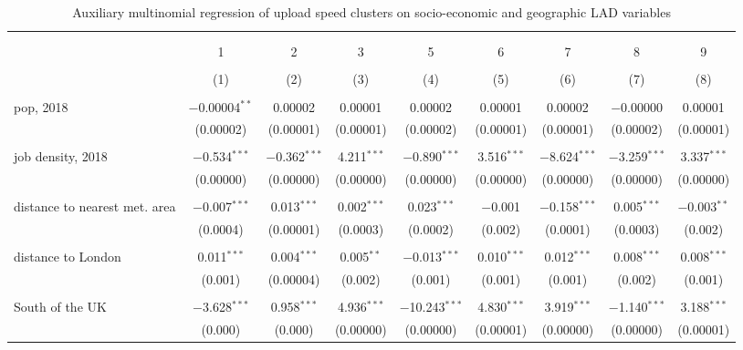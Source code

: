
\begin{sidewaystable}[!htbp] \centering 
  \caption{Auxiliary multinomial regression of upload speed clusters on socio-economic and geographic LAD variables\label{aux}} 
  \label{} 
\tiny 
\begin{tabular}{@{\extracolsep{5pt}}lcccccccc} 
\\[-1.8ex]\hline 
\hline \\[-1.8ex] 
\\[-1.8ex] & 1 & 2 & 3 & 5 & 6 & 7 & 8 & 9 \\ 
\\[-1.8ex] & (1) & (2) & (3) & (4) & (5) & (6) & (7) & (8)\\ 
\hline \\[-1.8ex] 
 pop, 2018 & $-$0.00004$^{**}$ & 0.00002 & 0.00001 & 0.00002 & 0.00001 & 0.00002 & $-$0.00000 & 0.00001 \\ 
  & (0.00002) & (0.00001) & (0.00001) & (0.00002) & (0.00001) & (0.00001) & (0.00002) & (0.00001) \\ 
  & & & & & & & & \\ 
 job density, 2018 & $-$0.534$^{***}$ & $-$0.362$^{***}$ & 4.211$^{***}$ & $-$0.890$^{***}$ & 3.516$^{***}$ & $-$8.624$^{***}$ & $-$3.259$^{***}$ & 3.337$^{***}$ \\ 
  & (0.00000) & (0.00000) & (0.00000) & (0.00000) & (0.00000) & (0.00000) & (0.00000) & (0.00000) \\ 
  & & & & & & & & \\ 
 distance to nearest met. area & $-$0.007$^{***}$ & 0.013$^{***}$ & 0.002$^{***}$ & 0.023$^{***}$ & $-$0.001 & $-$0.158$^{***}$ & 0.005$^{***}$ & $-$0.003$^{**}$ \\ 
  & (0.0004) & (0.00001) & (0.0003) & (0.0002) & (0.002) & (0.0001) & (0.0003) & (0.002) \\ 
  & & & & & & & & \\ 
 distance to London & 0.011$^{***}$ & 0.004$^{***}$ & 0.005$^{**}$ & $-$0.013$^{***}$ & 0.010$^{***}$ & 0.012$^{***}$ & 0.008$^{***}$ & 0.008$^{***}$ \\ 
  & (0.001) & (0.00004) & (0.002) & (0.001) & (0.001) & (0.001) & (0.002) & (0.001) \\ 
  & & & & & & & & \\ 
 South of the UK & $-$3.628$^{***}$ & 0.958$^{***}$ & 4.936$^{***}$ & $-$10.243$^{***}$ & 4.830$^{***}$ & 3.919$^{***}$ & $-$1.140$^{***}$ & 3.188$^{***}$ \\ 
  & (0.000) & (0.000) & (0.00000) & (0.00000) & (0.00001) & (0.00000) & (0.00000) & (0.00001) \\ 

\end{tabular}
\end{sidewaystable}
